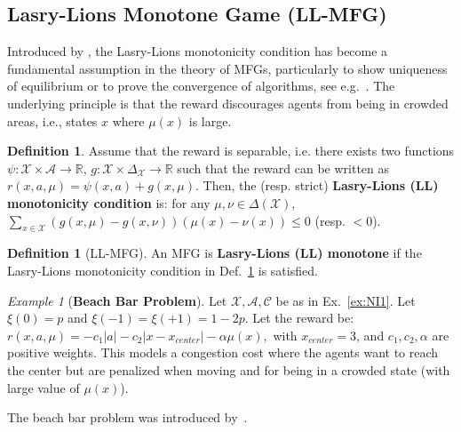 \documentclass[10pt,twocolumn,letterpaper]{article}
\theoremstyle{definition}
\newtheorem{definition}[theorem]{Definition}
\theoremstyle{remark}
\newtheorem{example}{Example}
\newcommand{\states}{\mathcal{X}}
\newcommand{\actions}{\mathcal{A}}
\newcommand{\noises}{\mathcal{C}}
\begin{document}
\subsection{Lasry-Lions Monotone Game (LL-MFG)}
Introduced by \citet{MR2295621}, the Lasry-Lions monotonicity condition has become a fundamental assumption in the theory of MFGs, particularly to show uniqueness of equilibrium or to prove the convergence of algorithms, see e.g.~\citep{perrin2020fictitious,perolat2021scalingMFGOMD}.
The underlying principle is that the reward discourages agents from being in crowded areas, i.e., states $x$ where $\mu(x)$ is large. 
\begin{mdframed}[
    linewidth=0pt,        %
    roundcorner=5pt,        %
    backgroundcolor=blue!5, 
    innertopmargin=2pt, 
    innerbottommargin=2pt
]
\begin{definition}%
\label{def:ll_mono}
    Assume that the reward is separable, i.e. there exists two functions $\psi:\mathcal X \times \mathcal A\to \mathbb R$,  $g:\mathcal X \times \Delta_{\mathcal X}\to \mathbb R$ such that the reward can be written as $r(x,a,\mu)=\psi(x,a) + g(x, \mu)$. Then, the (resp. strict) \textbf{Lasry-Lions (LL) monotonicity condition} is: for any $\mu, \nu \in \Delta(\mathcal X)$, 
    $\sum_{x \in \mathcal X}\left(g(x, \mu) - g(x, \nu)\right)(\mu(x) - \nu(x)) \leq 0$ (resp. $<0$).
\end{definition}

\begin{definition}[LL-MFG]
    An MFG is \textbf{Lasry-Lions (LL) monotone}  if the Lasry-Lions monotonicity condition in Def.~\ref{def:ll_mono} is satisfied.
\end{definition}\label{def:llm_game}
\end{mdframed}
\begin{example}[\textbf{Beach Bar Problem}]
    \label{ex:beach-bar}
    Let $\states, \actions, \noises$ be as in Ex.~\ref{ex:NI1}.
    Let $\xi(0) = p$ and $\xi(-1)= \xi(+1)= 1 -2p$. 
    Let the reward be: $r(x,a,  \mu) = -c_1|a| - c_2|x - x_{center}| - \alpha \mu(x),$ with $x_{center} = 3$, and $c_1, c_2, \alpha$ are positive weights. This models a congestion cost where the agents want to reach the center but are penalized when moving and for being in a crowded state (with large value of $\mu(x)$). 
\end{example}
The beach bar problem was introduced by~\citep{perrin2020fictitious}.
\end{document}

